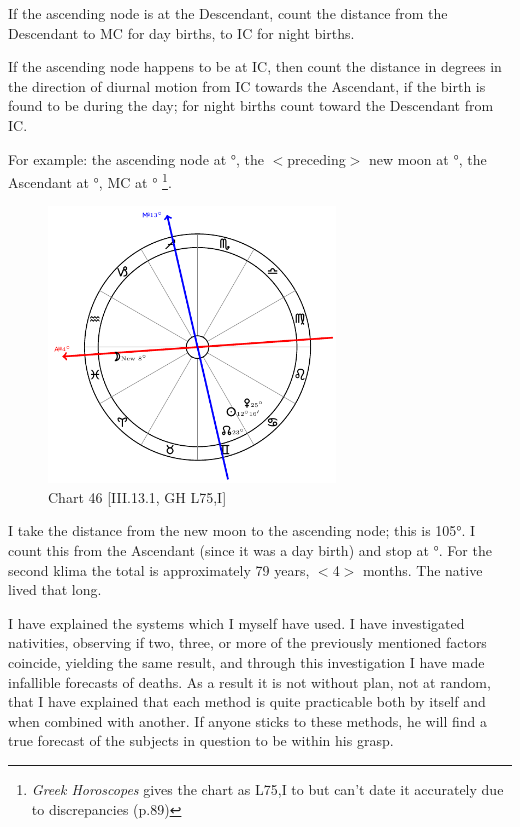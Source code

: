 If the ascending node is at the Descendant, count the distance from the Descendant to MC for day births, to IC for night births. 

If the ascending node happens to be at IC, then count the distance in degrees in the direction of diurnal motion
from IC towards the Ascendant, if the birth is found to be during the day; for night births count toward the Descendant from IC. 
\newpage

For example: the ascending node at \Gemini\xspace 23°, the $<$preceding$>$ new moon at \Pisces\xspace 8°, the Ascendant at \Pisces\xspace 4°, MC at \Sagittarius\xspace 13°
\footnote{\textit{Greek Horoscopes} gives the chart as L75,I to but can't date it accurately due to discrepancies (p.89)}. 

\clearpage
\begin{figure}
\centering
\vspace{-20pt}
\includegraphics[width=0.68\textwidth]{charts/3_13_1}
\caption{Chart 46 [III.13.1, GH L75,I]}
\label{fig:chart46}
\end{figure}

I take the distance from the new moon to the ascending node; this is 105°. I count this from the Ascendant (since it was a day birth) and stop at \Gemini\xspace 19°. For the second klima the total is approximately 79 years, $<$4$>$ months. The native lived that long.

I have explained the systems which I myself have used. I have investigated nativities, observing if two, three, or more of the previously mentioned factors coincide, yielding the same result, and through this investigation I have made infallible forecasts of deaths. As a result it is not without plan, not at random, that I have explained that each method is quite practicable both by itself and when combined with another.
If anyone sticks to these methods, he will find a true forecast of the subjects in question to be within his grasp. 

